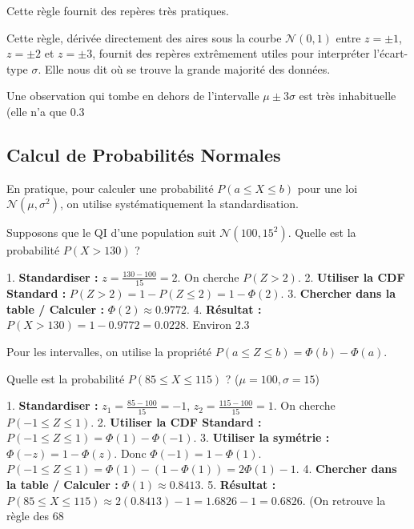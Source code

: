 Cette règle fournit des repères très pratiques.

\begin{intuitionbox}
Cette règle, dérivée directement des aires sous la courbe $\mathcal{N}(0, 1)$ entre $z=\pm 1$, $z=\pm 2$ et $z=\pm 3$, fournit des repères extrêmement utiles pour interpréter l'écart-type $\sigma$. Elle nous dit où se trouve la grande majorité des données.


Une observation qui tombe en dehors de l'intervalle $\mu \pm 3\sigma$ est très inhabituelle (elle n'a que 0.3%
\end{intuitionbox}

\subsection{Calcul de Probabilités Normales}

En pratique, pour calculer une probabilité $P(a \le X \le b)$ pour une loi $\mathcal{N}(\mu, \sigma^2)$, on utilise systématiquement la standardisation.

\begin{examplebox}
Supposons que le QI d'une population suit $\mathcal{N}(100, 15^2)$. Quelle est la probabilité $P(X > 130)$ ?

1.  \textbf{Standardiser :} $z = \frac{130 - 100}{15} = 2$. On cherche $P(Z > 2)$.
2.  \textbf{Utiliser la CDF Standard :} $P(Z > 2) = 1 - P(Z \le 2) = 1 - \Phi(2)$.
3.  \textbf{Chercher dans la table / Calculer :} $\Phi(2) \approx 0.9772$.
4.  \textbf{Résultat :} $P(X > 130) = 1 - 0.9772 = 0.0228$. Environ 2.3%
\end{examplebox}

Pour les intervalles, on utilise la propriété $P(a \le Z \le b) = \Phi(b) - \Phi(a)$.

\begin{examplebox}
Quelle est la probabilité $P(85 \le X \le 115)$ ? ($\mu=100, \sigma=15$)

1.  \textbf{Standardiser :} $z_1 = \frac{85 - 100}{15} = -1$, $z_2 = \frac{115 - 100}{15} = 1$. On cherche $P(-1 \le Z \le 1)$.
2.  \textbf{Utiliser la CDF Standard :} $P(-1 \le Z \le 1) = \Phi(1) - \Phi(-1)$.
3.  \textbf{Utiliser la symétrie :} $\Phi(-z) = 1 - \Phi(z)$. Donc $\Phi(-1) = 1 - \Phi(1)$.
    $P(-1 \le Z \le 1) = \Phi(1) - (1 - \Phi(1)) = 2\Phi(1) - 1$.
4.  \textbf{Chercher dans la table / Calculer :} $\Phi(1) \approx 0.8413$.
5.  \textbf{Résultat :} $P(85 \le X \le 115) \approx 2(0.8413) - 1 = 1.6826 - 1 = 0.6826$. (On retrouve la règle des 68%
\end{examplebox}

